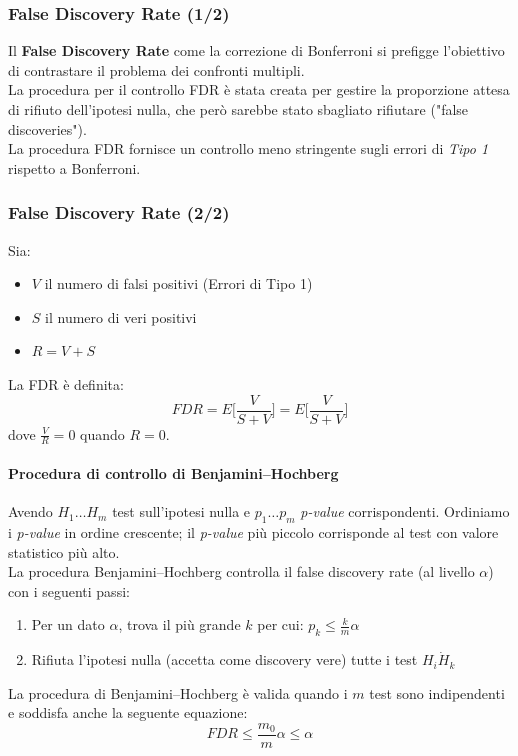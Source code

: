 \documentclass{beamer}
\begin{document}
\begin{frame}
\frametitle{False Discovery Rate (1/2)}
Il \textbf{False Discovery Rate} come la correzione di Bonferroni si prefigge l'obiettivo di contrastare il problema dei confronti multipli.\\
\smallskip
La procedura per il controllo FDR è stata creata per gestire la proporzione attesa di rifiuto dell'ipotesi nulla,  che però sarebbe stato sbagliato rifiutare ("false discoveries").\\
\smallskip
La procedura FDR fornisce un controllo meno stringente sugli errori di \textit{Tipo 1} rispetto a Bonferroni.
\end{frame}

\begin{frame}
\frametitle{False Discovery Rate (2/2)}
Sia:
\begin{itemize}
\item $V$ il numero di falsi positivi (Errori di Tipo 1)
\item $S$ il numero di veri positivi 
\item $R =  V+S$ 
\end{itemize}
La FDR è definita:
\begin{equation*}
FDR = E\Big[\frac{V}{S+V}\Big] = E\Big[\frac{V}{S+V}\Big]
\end{equation*}
dove $\frac{V}{R} = 0$ quando $R = 0$.
\end{frame}

\begin{frame}
\framesubtitle{Procedura di controllo di Benjamini–Hochberg}
Avendo $H_1 \dots H_m$ test sull'ipotesi nulla e $p_1 \dots p_m$ \textit{p-value} corrispondenti. Ordiniamo i \textit{p-value} in ordine crescente; il \textit{p-value} più piccolo corrisponde al test con valore statistico più alto.\\
\smallskip
La procedura Benjamini–Hochberg controlla il false discovery rate (al livello $\alpha$) con i seguenti passi:\\
\medskip
\begin{enumerate}
\item Per un dato $\alpha$, trova il più grande $k$ per cui: $p_k \leq \frac{k}{m}\alpha$
\item Rifiuta l'ipotesi nulla (accetta come discovery vere) tutte i test $H_i \dot H_k$
\end{enumerate}
La procedura di Benjamini–Hochberg è valida quando i $m$ test sono indipendenti e soddisfa anche la seguente equazione:
\begin{equation*}
FDR \leq \frac{m_0}{m}\alpha \leq \alpha
\end{equation*}
\end{frame}
\end{document}
